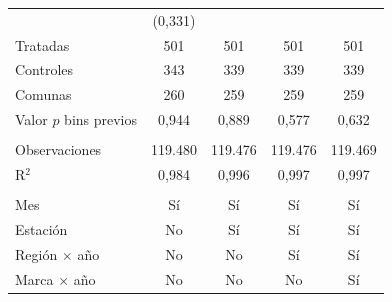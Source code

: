 \begin{tabular}{lcccc}
                          & (0{,}331)        &                &                &   \\   
   Tratadas               & 501            & 501            & 501            & 501\\  
   Controles              & 343            & 339            & 339            & 339\\  
   Comunas                & 260            & 259            & 259            & 259\\  
   Valor $p$ bins previos & 0{,}944          & 0{,}889          & 0{,}577          & 0{,}632\\  
    \\
   Observaciones          & 119.480        & 119.476        & 119.476        & 119.469\\  
   R$^2$                  & 0{,}984          & 0{,}996          & 0{,}997          & 0{,}997\\  
    \\
   Mes                    & Sí             & Sí             & Sí             & Sí\\  
   Estación               & No             & Sí             & Sí             & Sí\\  
   Región $\times$ año    & No             & No             & Sí             & Sí\\  
   Marca $\times$ año     & No             & No             & No             & Sí\\  
   \bottomrule
\end{tabular}
\par\endgroup
